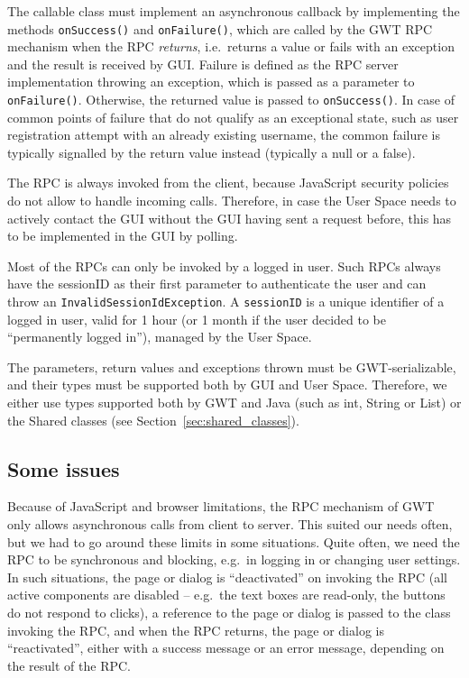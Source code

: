 The callable class must implement an asynchronous callback by implementing the methods {\tt onSuccess()} and {\tt onFailure()}, which are called by the GWT RPC mechanism when the RPC \emph{returns}, i.e.\ returns a value or fails with an exception and the result is received by GUI. Failure is defined as the RPC server implementation throwing an exception, which is passed as a parameter to {\tt onFailure()}. Otherwise, the returned value is passed to {\tt onSuccess()}.
In case of common points of failure that do not qualify as an exceptional state, such as user registration attempt with an already existing username, the common failure is typically signalled by the return value instead (typically a null or a false).

The RPC is always invoked from the client, because JavaScript security policies do not allow to handle incoming calls.
Therefore, in case the User Space needs to actively contact the GUI without the GUI having sent a request before,
this has to be implemented in the GUI by polling.

Most of the RPCs can only be invoked by a logged in user. Such RPCs always have the sessionID as their first parameter to authenticate the user and can throw an {\tt InvalidSessionIdException}.
A {\tt sessionID} is a unique identifier of a logged in user, valid for 1 hour (or 1 month if the user decided to be ``permanently logged in''), managed by the User Space.

The parameters, return values and exceptions thrown must be GWT-serializable, and their types must be supported both by GUI and User Space. Therefore, we either use types supported both by GWT and Java (such as int, String or List) or the Shared classes (see Section~\ref{sec:shared_classes}).

\subsection{Some issues}

Because of JavaScript and browser limitations, the RPC mechanism of GWT only allows asynchronous calls from client to server. This suited our needs often, but we had to go around these limits in some situations. Quite often, we need the RPC to be synchronous and blocking, e.g.\ in logging in or changing user settings. In such situations, the page or dialog is ``deactivated'' on invoking the RPC (all active components are disabled -- e.g.\ the text boxes are read-only, the buttons do not respond to clicks), a reference to the page or dialog is passed to the class invoking the RPC, and when the RPC returns, the page or dialog is ``reactivated'', either with a success message or an error message, depending on the result of the RPC.

